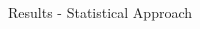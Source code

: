 \documentclass[final]{beamer}
\begin{document}
\begin{frame}{}
\begin{columns}[t]
\begin{column}{.48\linewidth}
\begin{block}{Results - Statistical Approach}
        \end{block}
        

      \end{column}
      
      
    \end{columns}
  \end{frame}
\end{document}
